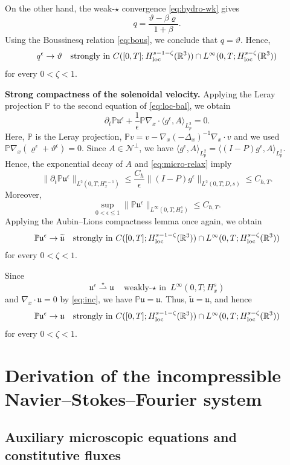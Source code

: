 \documentclass[10pt,reqno]{amsart}
\numberwithin{equation}{section}
\newcommand{\lt}{\left}
\newcommand{\rt}{\right}
\newcommand{\lal}{\langle}
\newcommand{\ral}{\rangle}
\newcommand{\mP}{\mathbb{P}}
\newcommand{\vrh}{\varrho}
\newcommand{\vth}{\vartheta}
\newcommand{\mfu}{\mathfrak{u}}
\newcommand{\R}{\mathbb R}
\newcommand{\bq}{\begin{equation}}
\newcommand{\eq}{\end{equation}}
\newcommand{\pa}{\partial}
\newcommand{\calN}{\mathcal N}
\begin{document}
On the other hand, the weak-$\star$ convergence \eqref{eq:hydro-wk} gives
\[
q=\frac{\vth-\beta \vrh}{1+\beta }.
\]
Using the Boussinesq relation \eqref{eq:bous}, we conclude that $q=\vth$. Hence,
\bq\label{eq:theta-strong}
q^\epsilon\to\vth\quad\text{strongly in } C([0,T];H^{s-1-\zeta}_{\rm loc}(\R^3))\cap L^\infty(0,T;H^{s-\zeta}_{\rm loc}(\R^3))
\eq
for every $0<\zeta<1$.

\medskip

\noindent
\textbf{Strong compactness of the solenoidal velocity.}
Applying the Leray projection $\mP$ to the second equation of \eqref{eq:loc-bal}, we obtain
\[
\pa_t\mP\mfu^\epsilon+\frac{1}{\epsilon}\mP\nabla_x\cdot\lal g^\epsilon,A \ral_{L^2_p}=0.
\]
Here, $\mP$ is the Leray projection, $\mP v=v-\nabla_x(-\Delta_x)^{-1}\nabla_x\cdot v$ and we used $\mP\nabla_x\lt(\vrh^\epsilon+\vth^\epsilon\rt)=0$. Since $A \in\calN^\perp$, we have $\lal g^\epsilon,A \ral_{L^2_p}=\lal(I-P)g^\epsilon,A \ral_{L^2_p}$. Hence, the exponential decay of $A $ and \eqref{eq:micro-relax} imply
\[
\|\pa_t\mP\mfu^\epsilon\|_{L^2(0,T;H^{s-1}_x)}\le\frac{C_\hbar}{\epsilon}\|(I-P)g^\epsilon\|_{L^2(0,T;D,s)}\le C_{\hbar,T}.
\]
Moreover,
\[
\sup_{0<\epsilon\le1}\|\mP\mfu^\epsilon\|_{L^\infty(0,T;H^s_x)}\le C_{\hbar,T}.
\]
Applying the Aubin--Lions compactness lemma once again, we obtain
\[
\mP\mfu^\epsilon\to\widetilde{\mfu}\quad\text{strongly in } C([0,T];H^{s-1-\zeta}_{\rm loc}(\R^3))\cap L^\infty(0,T;H^{s-\zeta}_{\rm loc}(\R^3))
\]
for every $0<\zeta<1$.

Since
\[
\mfu^\epsilon\overset{\star}{\rightharpoonup}\mfu\quad\text{weakly-$\star$ in }L^\infty(0,T;H^s_x)
\]
and $\nabla_x\cdot\mfu=0$ by \eqref{eq:inc}, we have $\mP\mfu=\mfu$. Thus, $\widetilde{\mfu}=\mfu$,
and hence
\bq\label{eq:u-strong}
\mP\mfu^\epsilon\to\mfu\quad\text{strongly in } C([0,T];H^{s-1-\zeta}_{\rm loc}(\R^3))\cap L^\infty(0,T;H^{s-\zeta}_{\rm loc}(\R^3))
\eq
for every $0<\zeta<1$.


%
%
%
%
%
%
%
%
%
%
\section{Derivation of the incompressible Navier--Stokes--Fourier system}\label{sec:NSF}
%
%
%
%
%
%
%
%
%
%
\subsection{Auxiliary microscopic equations and constitutive fluxes}
\end{document}
